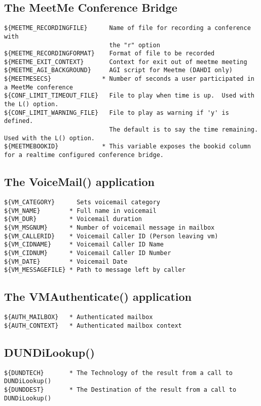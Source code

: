 \subsection{The MeetMe Conference Bridge}
\begin{verbatim}
${MEETME_RECORDINGFILE}      Name of file for recording a conference with
                             the "r" option
${MEETME_RECORDINGFORMAT}    Format of file to be recorded
${MEETME_EXIT_CONTEXT}       Context for exit out of meetme meeting
${MEETME_AGI_BACKGROUND}     AGI script for Meetme (DAHDI only)
${MEETMESECS}              * Number of seconds a user participated in a MeetMe conference
${CONF_LIMIT_TIMEOUT_FILE}   File to play when time is up.  Used with the L() option.
${CONF_LIMIT_WARNING_FILE}   File to play as warning if 'y' is defined.
                             The default is to say the time remaining.  Used with the L() option.
${MEETMEBOOKID}            * This variable exposes the bookid column for a realtime configured conference bridge.
\end{verbatim}

\subsection{The VoiceMail() application}
\begin{verbatim}
${VM_CATEGORY}      Sets voicemail category
${VM_NAME}        * Full name in voicemail
${VM_DUR}         * Voicemail duration
${VM_MSGNUM}      * Number of voicemail message in mailbox
${VM_CALLERID}    * Voicemail Caller ID (Person leaving vm)
${VM_CIDNAME}     * Voicemail Caller ID Name
${VM_CIDNUM}      * Voicemail Caller ID Number
${VM_DATE}        * Voicemail Date
${VM_MESSAGEFILE} * Path to message left by caller
\end{verbatim}

\subsection{The VMAuthenticate() application}
\begin{verbatim}
${AUTH_MAILBOX}   * Authenticated mailbox
${AUTH_CONTEXT}   * Authenticated mailbox context
\end{verbatim}

\subsection{DUNDiLookup()}
\begin{verbatim}
${DUNDTECH}       * The Technology of the result from a call to DUNDiLookup()
${DUNDDEST}       * The Destination of the result from a call to DUNDiLookup()
\end{verbatim}

